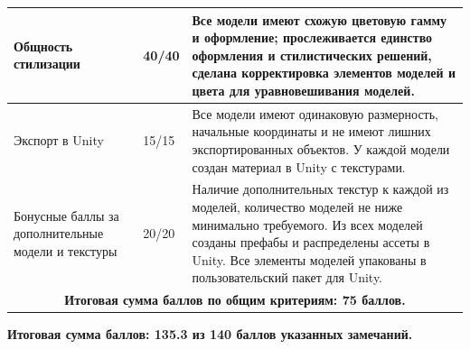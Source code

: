 \begin{longtable}{|p{4cm}|p{2.5cm}|p{7.5cm}|}
    Общность стилизации & 40/40 & Все модели имеют схожую цветовую гамму и оформление; прослеживается единство оформления и стилистических решений, сделана корректировка элементов моделей и цвета для уравновешивания моделей. \\
    \hline
    Экспорт в Unity & 15/15 & Все модели имеют одинаковую размерность, начальные координаты и не имеют лишних экспортированных объектов. У каждой модели создан материал в Unity с текстурами. \\
    \hline
    Бонусные баллы за дополнительные модели и текстуры & 20/20 & Наличие дополнительных текстур к каждой из моделей, количество моделей не ниже минимально требуемого. Из всех моделей созданы префабы и распределены ассеты в Unity. Все элементы моделей упакованы в пользовательский пакет для Unity.\\
    \hline
    \multicolumn{3}{|c|}{\textbf{Итоговая сумма баллов по общим критериям: 75 баллов.}} \\
    \hline
\end{longtable}

\textbf{Итоговая сумма баллов: 135.3 из 140 баллов  указанных замечаний.}